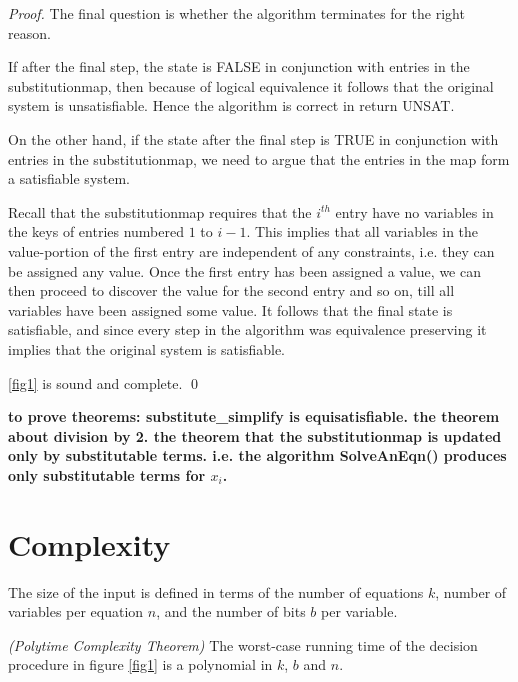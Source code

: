 \begin{proof}
The final question is whether the algorithm terminates for the right
reason.

If after the final step, the state is FALSE in conjunction with
entries in the substitutionmap, then because of logical equivalence it
follows that the original system is unsatisfiable. Hence the algorithm
is correct in return UNSAT.

On the other hand, if the state after the final step is TRUE in
conjunction with entries in the substitutionmap, we need to argue that
the entries in the map form a satisfiable system. 

Recall that the substitutionmap requires that the $i^{th}$ entry have
no variables in the keys of entries numbered $1$ to $i-1$. This
implies that all variables in the value-portion of the first entry are
independent of any constraints, i.e. they can be assigned any
value. Once the first entry has been assigned a value, we can then
proceed to discover the value for the second entry and so on, till all
variables have been assigned some value. It follows that the final
state is satisfiable, and since every step in the algorithm was
equivalence preserving it implies that the original system is
satisfiable.

\ref{fig1} is sound and complete.  
\qed
\end{proof}

\textbf{to prove theorems: substitute\_simplify is equisatisfiable.  the
theorem about division by 2. the theorem that the substitutionmap is
updated only by substitutable terms. i.e. the algorithm SolveAnEqn()
produces only substitutable terms for $x_i$.}

\section{Complexity}

The size of the input is defined in terms of the number of equations
$k$, number of variables per equation $n$, and the number of bits $b$
per variable.

\begin{theorem}
\emph{(Polytime Complexity Theorem)}
\label{complexity}
The worst-case running time of the decision procedure in figure
\ref{fig1} is a polynomial in $k$, $b$ and $n$.
\end{theorem}

